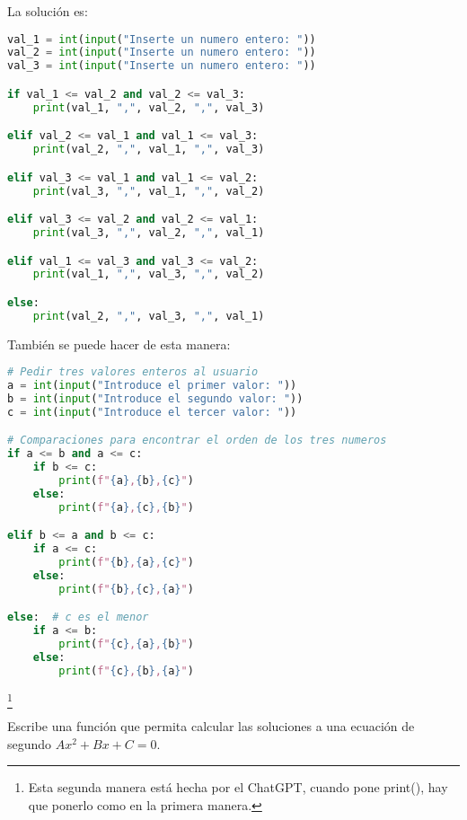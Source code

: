 \documentclass{article}
\begin{document}
\begin{sol} La solución es:
\begin{lstlisting}[language = Python]
val_1 = int(input("Inserte un numero entero: "))
val_2 = int(input("Inserte un numero entero: "))
val_3 = int(input("Inserte un numero entero: "))

if val_1 <= val_2 and val_2 <= val_3:
	print(val_1, ",", val_2, ",", val_3)

elif val_2 <= val_1 and val_1 <= val_3:
	print(val_2, ",", val_1, ",", val_3)

elif val_3 <= val_1 and val_1 <= val_2:
	print(val_3, ",", val_1, ",", val_2)

elif val_3 <= val_2 and val_2 <= val_1:
	print(val_3, ",", val_2, ",", val_1)

elif val_1 <= val_3 and val_3 <= val_2:
	print(val_1, ",", val_3, ",", val_2)

else:
	print(val_2, ",", val_3, ",", val_1)
\end{lstlisting}
También se puede hacer de esta manera:
\begin{lstlisting}[language = Python]
# Pedir tres valores enteros al usuario
a = int(input("Introduce el primer valor: "))
b = int(input("Introduce el segundo valor: "))
c = int(input("Introduce el tercer valor: "))

# Comparaciones para encontrar el orden de los tres numeros
if a <= b and a <= c:
    if b <= c:
        print(f"{a},{b},{c}")
    else:
        print(f"{a},{c},{b}")

elif b <= a and b <= c:
    if a <= c:
        print(f"{b},{a},{c}")
    else:
        print(f"{b},{c},{a}")

else:  # c es el menor
    if a <= b:
        print(f"{c},{a},{b}")
    else:
        print(f"{c},{b},{a}")
\end{lstlisting}
\footnote{Esta segunda manera está hecha por el ChatGPT, cuando pone print(), hay que ponerlo como en la primera manera.} 
\end{sol}

\begin{ej}
Escribe una función que permita calcular las soluciones a una ecuación de segundo $\displaystyle Ax^{2} + Bx + C = 0 $.
\end{ej}
\end{document}
